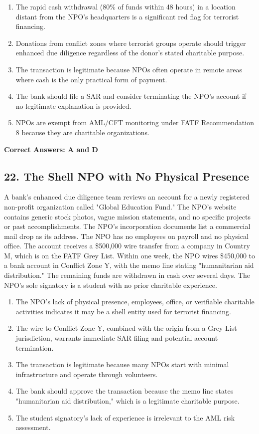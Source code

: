 \documentclass[11pt,a4paper]{article}
\begin{document}
	\begin{enumerate}[label=\Alph*.]
		\item The rapid cash withdrawal (80\% of funds within 48 hours) in a location distant from the NPO's headquarters is a significant red flag for terrorist financing.
		\item Donations from conflict zones where terrorist groups operate should trigger enhanced due diligence regardless of the donor's stated charitable purpose.
		\item The transaction is legitimate because NPOs often operate in remote areas where cash is the only practical form of payment.
		\item The bank should file a SAR and consider terminating the NPO's account if no legitimate explanation is provided.
		\item NPOs are exempt from AML/CFT monitoring under FATF Recommendation 8 because they are charitable organizations.
	\end{enumerate}
	
	\textbf{Correct Answers: A and D}
	
	\subsection{22. The Shell NPO with No Physical Presence}
	
	A bank's enhanced due diligence team reviews an account for a newly registered non-profit organization called "Global Education Fund." The NPO's website contains generic stock photos, vague mission statements, and no specific projects or past accomplishments. The NPO's incorporation documents list a commercial mail drop as its address. The NPO has no employees on payroll and no physical office. The account receives a \$500,000 wire transfer from a company in Country M, which is on the FATF Grey List. Within one week, the NPO wires \$450,000 to a bank account in Conflict Zone Y, with the memo line stating "humanitarian aid distribution." The remaining funds are withdrawn in cash over several days. The NPO's sole signatory is a student with no prior charitable experience.
	
	\begin{enumerate}[label=\Alph*.]
		\item The NPO's lack of physical presence, employees, office, or verifiable charitable activities indicates it may be a shell entity used for terrorist financing.
		\item The wire to Conflict Zone Y, combined with the origin from a Grey List jurisdiction, warrants immediate SAR filing and potential account termination.
		\item The transaction is legitimate because many NPOs start with minimal infrastructure and operate through volunteers.
		\item The bank should approve the transaction because the memo line states "humanitarian aid distribution," which is a legitimate charitable purpose.
		\item The student signatory's lack of experience is irrelevant to the AML risk assessment.
	\end{enumerate}
	
\end{document}
